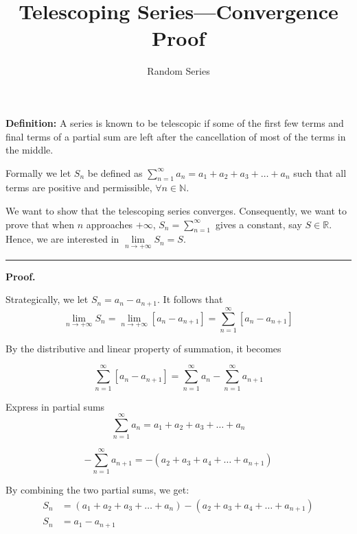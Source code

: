 \documentclass{article}
\title{\textbf{Telescoping Series—Convergence Proof} \\[-0.75em]}
\author{Random Series}
\date{}
\begin{document}
\maketitle
\vspace{-3ex}

\thispagestyle{empty}

\maketitle
\vspace{-0.7ex}

\textbf{Definition:} A series is known to be telescopic if some of the first few terms and final terms of a partial sum are left after the cancellation of most of the terms in the middle.

{Formally we let $S_n$ be defined as $\sum\limits_{n=1}^{\infty} a_n=a_1+a_2+a_3+\dots+a_n$ such that all terms are positive and permissible, $\forall n \in \mathbb{N}$.}

{We want to show that the telescoping series converges. Consequently, we want to prove that when $n$ approaches $+ \infty$, $S_n=\sum\limits_{n=1}^{\infty}$ gives a constant, say $S \in \mathbb{R}$. Hence, we are interested in $\lim\limits_{n \to +\infty} S_n=S$.}

\vspace{0.5cm} %
\hrule %
\vspace{0.5cm} %

\textbf{Proof.}

{Strategically, we let $S_n=a_n-a_{n+1}$. It follows that}
$$\lim_{n \to +\infty} S_n=\lim_{n \to +\infty} [a_n - a_{n+1}]=\sum_{n=1}^{\infty} [a_n-a_{n+1}]$$

{By the distributive and linear property of summation, it becomes}

$$\sum_{n=1}^{\infty} [a_n-a_{n+1}]=\sum_{n=1}^{\infty} a_n - \sum_{n=1}^{\infty} a_{n+1}$$

{Express in partial sums}
$$\sum_{n=1}^{\infty} a_n=a_1+a_2+a_3 + \dots+a_n$$

$$-\sum_{n=1}^{\infty} a_{n+1} =-(a_2+a_3+a_4+\dots +a_{n+1})$$

By combining the two partial sums, we get:
\begin{align*}
    S_n &= (a_1 + a_2 + a_3 + \dots + a_n) - (a_2 + a_3 + a_4 + \dots + a_{n+1}) \\
    S_n &= a_1 - a_{n+1}
\end{align*}
\end{document}
